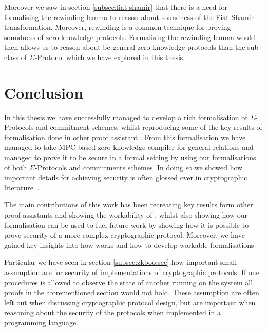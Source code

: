 Moreover we saw in section \ref{subsec:fiat-shamir} that there is a need for
formalising the rewinding lemma to reason about soundness of the Fiat-Shamir
transformation. Moreover, rewinding is a common technique for proving soundness
of zero-knowledge protocols. Formalising the rewinding lemma would then allows
us to reason about be general zero-knowledge protocols than the sub-class of
$\Sigma$-Protocol which we have explored in this thesis.


\section{Conclusion}
\label{sec:conclusion}

In this thesis we have successfully managed to develop a rich formalisation of
$\Sigma$-Protocols and commitment schemes, whilst reproducing some of the key results of
formalisation done in other proof assistant \cite{cryptoeprint:2019:1185,certicrypt_sigma}.
From this formalisation we have managed to take MPC-based zero-knowledge
compiler for general relations and managed to prove it to be secure in a formal
setting by using our formalisations of both $\Sigma$-Protocols and commitments
schemes. In doing so we showed how important details for achieving security is
often glossed over in cryptographic literature...

The main contributions of this work has been recreating key results form other
proof assistants and showing the workability of \easycrypt, whilst also showing
how our formalisation can be used to fuel future work by showing how it is
possible to prove security of a more complex cryptographic protocol.
Moreover, we have gained key insights into how \easycrypt works and how to
develop workable formalisations

Particular we have seen in section \ref{subsec:zkboo:sec} how important small
assumption are for security of implementations of cryptographic protocols. If
one procedures is allowed to observe the state of another running on the system
all proofs in the aforementioned section would not hold. These assumption are
often left out when discussing cryptographic protocol design, but are important
when reasoning about the security of the protocols when implemented in a
programming language.

